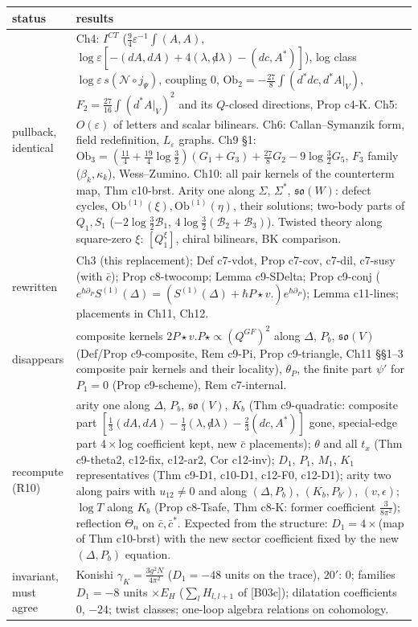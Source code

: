 \documentclass[11pt]{article}
\theoremstyle{plain}
\theoremstyle{definition}
\numberwithin{equation}{section}
\begin{document}
\begin{longtable}{p{3.2cm}|p{12.6cm}}
\toprule
status & results \\
\midrule
pullback, identical & Ch4: $I^{CT}$ ($\tfrac94\varepsilon^{-1}\int(A,A)$, $\log\varepsilon[-(dA,dA)+4(\lambda,{\not d}\lambda)-(dc,A^*)]$), log class $\log\varepsilon\,s(\mathcal N\circ j_\Psi)$, coupling $0$, $\mathrm{Ob}_2=-\tfrac{27}8\int(d^*dc,d^*A|_V)$, $F_2=\tfrac{27}{16}\int(d^*A|_V)^2$ and its $Q$-closed directions, Prop c4-K. Ch5: $O(\varepsilon)$ of letters and scalar bilinears. Ch6: Callan--Symanzik form, field redefinition, $L_\varepsilon$ graphs. Ch9 \S1: $\mathrm{Ob}_3=(\tfrac{11}4+\tfrac{19}4\log\tfrac32)(G_1+G_3)+\tfrac{27}8G_2-9\log\tfrac32G_5$, $F_3$ family ($\beta_k,\kappa_k$), Wess--Zumino. Ch10: all pair kernels of the counterterm map, Thm c10-brst. Arity one along $\Sigma$, $\Sigma^*$, $\mathfrak{so}(W)$: defect cycles, $\mathrm{Ob}^{(1)}(\xi),\mathrm{Ob}^{(1)}(\eta)$, their solutions; two-body parts of $Q_1,S_1$ ($-2\log\tfrac32\mathcal B_1$, $4\log\tfrac32(\mathcal B_2+\mathcal B_3)$). Twisted theory along square-zero $\xi$: $[Q^\xi_1]$, chiral bilinears, BK comparison. \\
\midrule
rewritten & Ch3 (this replacement); Def c7-vdot, Prop c7-cov, c7-dil, c7-susy (with $\bar c$); Prop c8-twocomp; Lemma c9-SDelta; Prop c9-conj ($e^{\hbar\partial_P}S^{(1)}(\Delta)=(S^{(1)}(\Delta)+\hbar P\star v.)e^{\hbar\partial_P}$); Lemma c11-lines; placements in Ch11, Ch12. \\
\midrule
disappears & composite kernels $2P\star v.P\star\propto(Q^{GF})^2$ along $\Delta$, $P_b$, $\mathfrak{so}(V)$ (Def/Prop c9-composite, Rem c9-Pi, Prop c9-triangle, Ch11 \S\S1--3 composite pair kernels and their locality), $\theta_P$, the finite part $\psi'$ for $P_1=0$ (Prop c9-scheme), Rem c7-internal. \\
\midrule
recompute (R10) & arity one along $\Delta$, $P_b$, $\mathfrak{so}(V)$, $K_b$ (Thm c9-quadratic: composite part $[\tfrac13(dA,dA)-\tfrac13(\lambda,{\not d}\lambda)-\tfrac23(dc,A^*)]$ gone, special-edge part $4\times$log coefficient kept, new $\bar c$ placements); $\theta$ and all $t_x$ (Thm c9-theta2, c12-fix, c12-ar2, Cor c12-inv); $D_1$, $P_1$, $M_1$, $K_1$ representatives (Thm c9-D1, c10-D1, c12-F0, c12-D1); arity two along pairs with $u_{12}\neq0$ and along $(\Delta,P_b)$, $(K_b,P_{b'})$, $(v,\epsilon)$; $\log T$ along $K_b$ (Prop c8-Tsafe, Thm c8-K: former coefficient $\tfrac3{8\pi^2}$); reflection $\Theta_n$ on $\bar c,\bar c^*$. Expected from the structure: $D_1=4\times$(map of Thm c10-brst) with the new sector coefficient fixed by the new $(\Delta,P_b)$ equation. \\
\midrule
invariant, must agree & Konishi $\gamma_K=\tfrac{3g^2N}{4\pi^2}$ ($D_1=-48$ units on the trace), $20'$: $0$; families $D_1=-8$ units $\times E_H$ ($\sum_lH_{l,l+1}$ of [B03c]); dilatation coefficients $0$, $-24$; twist classes; one-loop algebra relations on cohomology. \\
\bottomrule
\end{longtable}
\end{document}

